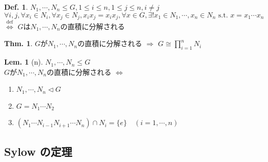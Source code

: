 \documentclass[uplatex,dvipdfmx,9pt]{beamer}
\newcommand{\defarrow}{\overset{\mathrm{def}}{\Leftrightarrow}}
\newcommand{\nsubgroup}{\vartriangleleft} %
\newcommand{\st}{\text{ s.t. }}
\newcounter{textLemCount}
\newcounter{textExmCount}
\theoremstyle{definition} %
\newtheorem{defn}{Def.}[subsection] %
\newtheorem{thm}{Thm.}[subsection] %
\newtheorem{lemText}[textLemCount]{Lem.} %
\theoremstyle{example}
\begin{document}
      \begin{frame}

        \begin{defn}
          $N_1, \cdots, N_n \le G, 1 \le i \le n, 1 \le j \le n, i \ne j$ \\
          $\forall i, j, \forall x_i \in N_i, \forall x_j \in N_j, x_ix_j = x_ix_j, \forall x \in G, \exists! x_1 \in N_1, \cdots, x_n \in N_n \st x = x_1 \cdots x_n$ \\
          $\defarrow$ $G$は$N_1, \cdots, N_n$の\alert{直積に分解される}
        \end{defn}

        \begin{thm}
          $G$が$N_1, \cdots, N_n$の直積に分解される $\Rightarrow$ $G \cong \displaystyle \prod_{i=1}^n N_i$
        \end{thm}

        \addtocounter{textLemCount}{-1}
        \begin{lemText}[n]
          $N_1, \cdots, N_n \le G$ \\
          $G$が$N_1, \cdots, N_n$の直積に分解される $\Leftrightarrow$
          \begin{enumerate}
            \item $N_1, \cdots, N_n \nsubgroup G$
            \item $G = N_1 \cdots N_2$
            \item $(N_1 \cdots N_{i-1} N_{i+1} \cdots N_n) \cap N_i = \{e\} \quad (i = 1, \cdots, n)$
          \end{enumerate}
        \end{lemText}
        
      \end{frame}

    \subsection{\textsection \thesubsection Sylow の定理}
    \setcounter{textExmCount}{0}
      
\end{document}
